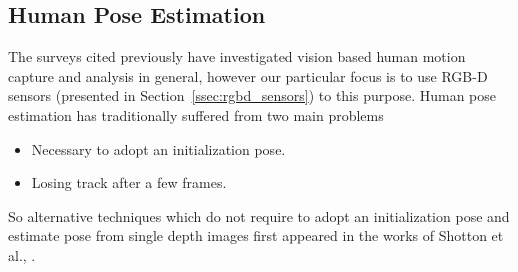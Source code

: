 \subsection{Human Pose Estimation}
\label{sec:humanpose}
The surveys \cite{Moeslund2001231}\cite{Moeslund200690}\cite{Poppe20074} cited previously have investigated vision based human motion capture and analysis in general, however our particular focus is to use RGB-D sensors (presented in Section~\ref{ssec:rgbd_sensors}) to this purpose. Human pose estimation has traditionally suffered from two main problems
\begin{itemize}
\item Necessary to adopt an initialization pose.
\item Losing track after a few frames.
\end{itemize}
So alternative techniques which do not require to adopt an initialization pose and estimate pose from single depth images first appeared in the works of Shotton et al., \cite{shotton2013real}.
